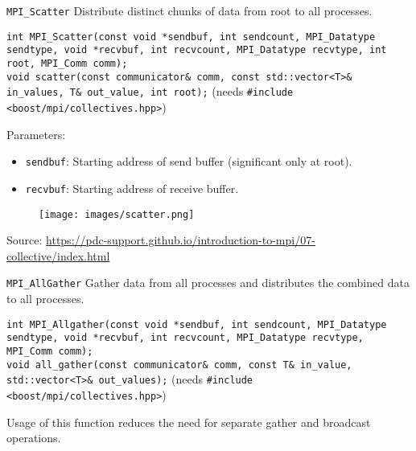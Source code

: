 \documentclass{beamer}
\begin{document}
\begin{frame}{\texttt{MPI\_Scatter}}
  Distribute distinct chunks of data from root to all processes.

  {
    \footnotesize
    \texttt{int MPI\_Scatter(const void *sendbuf, int sendcount, MPI\_Datatype sendtype, void *recvbuf, int recvcount, MPI\_Datatype recvtype, int root, MPI\_Comm comm);} \\
    \texttt{void scatter(const communicator\& comm, const std::vector<T>\& in\_values, T\& out\_value, int root);} (needs \texttt{\#include <boost/mpi/collectives.hpp>})
  }

  \begin{minipage}[t]{0.6\textwidth}
    Parameters:
    \begin{itemize}
      \item \texttt{sendbuf}: Starting address of send buffer (significant only at root).
      \item \texttt{recvbuf}: Starting address of receive buffer.
    \end{itemize}
  \end{minipage}
  \hfill
  \begin{minipage}[t]{0.35\textwidth}
    \begin{figure}[h]
      \texttt{[image: images/scatter.png]}
    \end{figure}
  \end{minipage}
  {\footnotesize Source: \href{https://pdc-support.github.io/introduction-to-mpi/07-collective/index.html}{https://pdc-support.github.io/introduction-to-mpi/07-collective/index.html}}
\end{frame}

\begin{frame}{\texttt{MPI\_AllGather}}
  Gather data from all processes and distributes the combined data to all processes.

  {
    \footnotesize
    \texttt{int MPI\_Allgather(const void *sendbuf, int sendcount, MPI\_Datatype sendtype, void *recvbuf, int recvcount, MPI\_Datatype recvtype, MPI\_Comm comm);} \\
    \texttt{void all\_gather(const communicator\& comm, const T\& in\_value, 
    std::vector<T>\& out\_values);} (needs \texttt{\#include <boost/mpi/collectives.hpp>})
  }

  Usage of this function reduces the need for separate gather and broadcast operations.
\end{frame}
\end{document}
